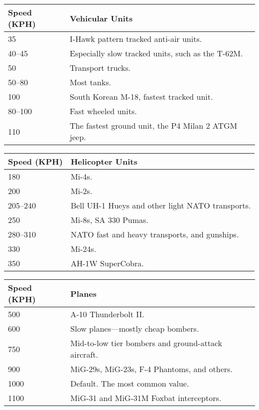 \documentclass{article}
\begin{document}
\begin{center}
    \begin{tabular}{ | l | p{9cm} | }
    \hline
    Speed (KPH) & Vehicular Units \\ \hline
    35 & I-Hawk pattern tracked anti-air units. \\ 
    40--45 & Especially slow tracked units, such as the T-62M. \\
    50 & Transport trucks.  \\ 
    50--80 & Most tanks. \\
    100 & South Korean M-18, fastest tracked unit.\\
    80--100 & Fast wheeled units. \\ 
    110 & The fastest ground unit, the P4 Milan 2 ATGM jeep. \\ \hline
    \end{tabular}
\end{center}

\begin{center}
    \begin{tabular}{ | l | p{9cm} | }
    \hline
    Speed (KPH) & Helicopter Units \\ \hline
    180 & Mi-4s. \\ 
    200 & Mi-2s. \\ 
    205--240 & Bell UH-1 Hueys and other light NATO transports. \\
    250 & Mi-8s, SA 330 Pumas. \\ 
    280--310 & NATO fast and heavy transports, and gunships. \\
    330 & Mi-24s. \\ 
    350 & AH-1W SuperCobra. \\ \hline

    \end{tabular}
\end{center}

\begin{center}
    \begin{tabular}{ | l | p{9cm} | }
    \hline
    Speed (KPH) & Planes \\ \hline
    500 & A-10 Thunderbolt II.\\
    600 & Slow planes---mostly cheap bombers. \\ 
    750 & Mid-to-low tier bombers and ground-attack aircraft. \\
    900 & MiG-29s, MiG-23s, F-4 Phantoms, and others. \\
    1000 & Default. The most common value. \\
    1100 & MiG-31 and MiG-31M Foxbat interceptors. \\
    \hline
    \end{tabular}
\end{center}
\end{document}

